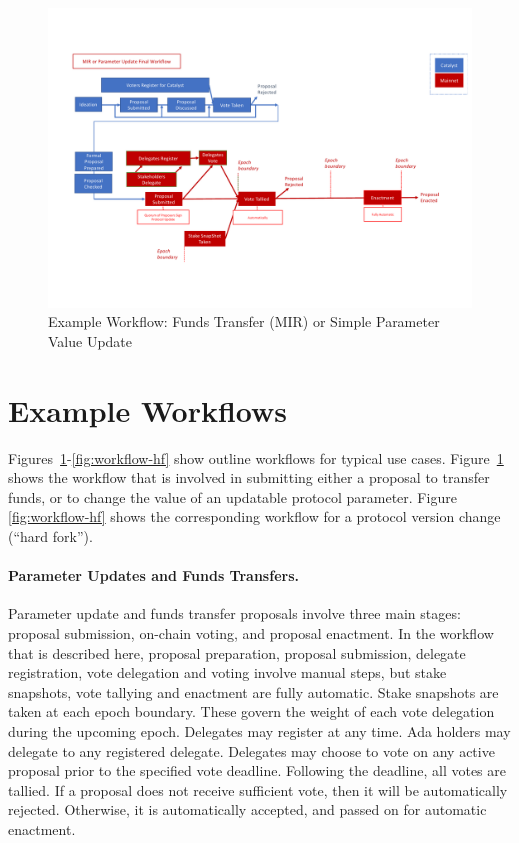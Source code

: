 \begin{figure}
  \includegraphics[trim=0 90 0 80,clip,width=\textwidth]{Workflow1}
  \caption{Example Workflow: Funds Transfer (MIR) or Simple Parameter Value Update}
  \label{fig:workflow-mir}
\end{figure}

\section{Example Workflows}
\label{sec:workflows}

Figures~\ref{fig:workflow-mir}-\ref{fig:workflow-hf} show outline workflows for
typical use cases.  Figure~\ref{fig:workflow-mir} shows the workflow that is
involved in submitting either a proposal to transfer funds, or to change the
value of an updatable protocol parameter.  Figure \ref{fig:workflow-hf} shows
the corresponding workflow for a protocol version change (``hard fork'').

\paragraph{Parameter Updates and Funds Transfers.}  Parameter update and funds transfer proposals involve three main stages:
proposal submission, on-chain voting, and proposal enactment.  In the workflow that is described
here, proposal preparation, proposal submission, delegate registration,
vote delegation and voting involve manual steps, but stake snapshots, vote tallying
and enactment are fully automatic.  Stake snapshots are taken at each epoch boundary.
These govern the weight of each vote delegation during the upcoming epoch.
%
Delegates may register at any time.  Ada holders may delegate to any registered delegate.
Delegates may choose to vote on any active proposal prior to the specified vote deadline.
Following the deadline, all votes are tallied.  If a proposal does not receive sufficient vote, then
it will be automatically rejected.  Otherwise, it is automatically accepted, and passed on for
automatic enactment.

